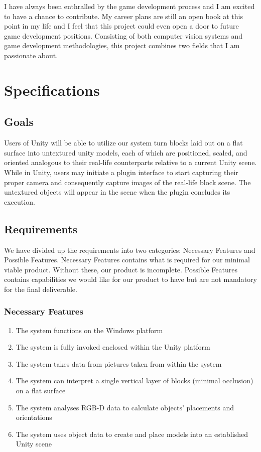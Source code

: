 \documentclass[12pt]{article}
\providecommand{\tightlist}{%
  \setlength{\itemsep}{0pt}\setlength{\parskip}{0pt}}
\begin{document}
I have always been enthralled by the game development process and I am
excited to have a chance to contribute. My career plans are still an
open book at this point in my life and I feel that this project could
even open a door to future game development positions. Consisting of
both computer vision systems and game development methodologies, this
project combines two fields that I am passionate about.

\section{Specifications}\label{specifications}

\subsection{Goals}\label{goals}

Users of Unity will be able to utilize our system turn blocks laid out
on a flat surface into untextured unity models, each of which are
positioned, scaled, and oriented analogous to their real-life
counterparts relative to a current Unity scene. While in Unity, users
may initiate a plugin interface to start capturing their proper camera
and consequently capture images of the real-life block scene. The
untextured objects will appear in the scene when the plugin concludes
its execution.

\subsection{Requirements}\label{requirements}

We have divided up the requirements into two categories: Necessary
Features and Possible Features. Necessary Features contains what is
required for our minimal viable product. Without these, our product is
incomplete. Possible Features contains capabilities we would like for
our product to have but are not mandatory for the final deliverable.

\subsubsection{Necessary Features}\label{necessary-features}

\begin{enumerate}
\def\labelenumi{\arabic{enumi}.}
\tightlist
\item
  The system functions on the Windows platform
\item
  The system is fully invoked enclosed within the Unity platform
\item
  The system takes data from pictures taken from within the system
\item
  The system can interpret a single vertical layer of blocks (minimal
  occlusion) on a flat surface
\item
  The system analyses RGB-D data to calculate objects' placements and
  orientations
\item
  The system uses object data to create and place models into an
  established Unity scene
\end{enumerate}
\end{document}
